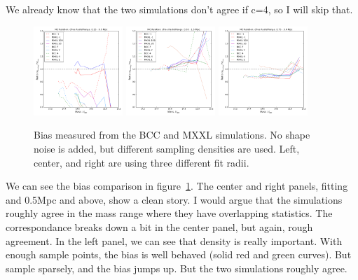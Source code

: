 \documentclass[11pt]{article}
\begin{document}
We already know that the two simulations don't agree if c=4, so I will skip that.


\begin{figure} \centering
\includegraphics[width=0.3\textwidth]{figures/density_cfree-r1}
\includegraphics[width=0.3\textwidth]{figures/density_cfree-r5}
\includegraphics[width=0.3\textwidth]{figures/density_cfree-r10}
\caption{Bias measured from the BCC and MXXL simulations. No shape noise is added, but different sampling densities are used. Left, center, and right are using three different fit radii.}
\label{fig:bcc_vs_mxxl_density}
\end{figure}

We can see the bias comparison in figure~\ref{fig:bcc_vs_mxxl_density}. The center and right panels, fitting and 0.5Mpc and above, show a clean story. I would argue that the simulations roughly agree in the mass range where they have overlapping statistics. The correspondance breaks down a bit in the center panel, but again, rough agreement. In the left panel, we can see that density is really important. With enough sample points, the bias is well behaved (solid red and green curves). But sample sparsely, and the bias jumps up. But the two simulations roughly agree.
\end{document}
